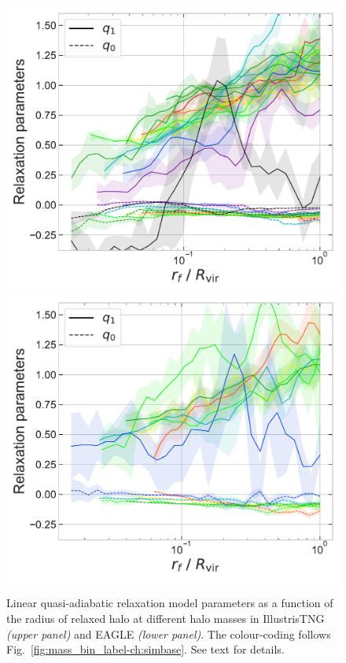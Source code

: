 \begin{figure}
    \centering
    \includegraphics[width=0.99\linewidth]{plots/fit_params_rf_M_T.pdf}
    \includegraphics[width=0.99\linewidth]{plots/fit_params_rf_M_E.pdf}
    \caption{Linear quasi-adiabatic relaxation model parameters as a function of the radius of relaxed halo at different halo masses in IllustrisTNG \emph{(upper panel)} and EAGLE \emph{(lower panel)}. The colour-coding follows Fig.~\ref{fig:mass_bin_label-ch:simbase}. See text for details.}
    \label{fig:rf-fit-params-ch:simbase}
\end{figure}


